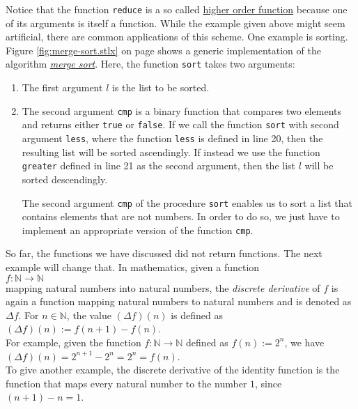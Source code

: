 Notice that the function \texttt{reduce} is a so called
\href{https://en.wikipedia.org/wiki/Higher-order_function}{higher order function} because  
one of its arguments is itself a function.  While the example given above might seem
artificial, there are common applications of this scheme.  One example is sorting.
Figure \ref{fig:merge-sort.stlx} on page \pageref{fig:merge-sort.stlx} shows a generic
implementation of the algorithm \href{https://en.wikipedia.org/wiki/Merge_sort}{\emph{merge sort}}.
Here, the function \texttt{sort} takes two arguments:
\begin{enumerate}
\item The first argument $l$ is the list to be sorted.
\item The second argument \texttt{cmp} is a binary function that compares two  elements
      and returns either \texttt{true} or \texttt{false}.  If we call the function
      \texttt{sort} with second argument \texttt{less}, where the function \texttt{less} is
      defined in line 20, then the resulting list will be sorted ascendingly.
      If instead we use the function \texttt{greater} defined in line 21 as the second
      argument, then the list $l$ will be sorted descendingly.

      The second argument \texttt{cmp} of the procedure \texttt{sort} enables us to sort a list that
      contains elements that are not numbers.  In order to do so, we just have to implement an
      appropriate version of the function \texttt{cmp}.
\end{enumerate}
So far, the functions we have discussed did not return functions.  The next example will change
that.  In mathematics, given a function
\\[0.2cm]
\hspace*{1.3cm}
$f: \mathbb{N} \rightarrow \mathbb{N}$
\\[0.2cm]
mapping natural numbers into natural numbers, the \emph{discrete derivative} of $f$ is again a
function mapping natural numbers to natural numbers and is denoted
as $\Delta f$.  For $n \in \mathbb{N}$, the value $(\Delta f)(n)$ is defined as
\\[0.2cm]
\hspace*{1.3cm}
$(\Delta f)(n) := f(n+1) - f(n)$.
\\[0.2cm]
For example, given the function $f: \mathbb{N} \rightarrow \mathbb{N}$ defined as $f(n) := 2^n$,
we have
\\[0.2cm]
\hspace*{1.3cm}
$(\Delta f)(n) = 2^{n+1} - 2^n = 2^n = f(n)$.
\\[0.2cm]
To give another example, the discrete derivative of the identity function is the function that
maps every natural number to the number $1$, since $(n+1) - n = 1$.  

